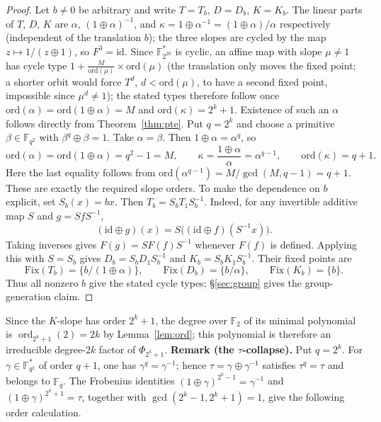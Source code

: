 \documentclass[11pt]{article}
\begin{document}
\begin{proof}
Let $b\ne0$ be arbitrary and write $T=T_b$, $D=D_b$, $K=K_b$.
The linear parts of $T$, $D$, $K$ are
$\alpha$, $(1\oplus\alpha)^{-1}$, and
$\kappa=1\oplus\alpha^{-1}=(1\oplus\alpha)/\alpha$
respectively (independent of the translation $b$); the three slopes are cycled by
the map $z\mapsto 1/(z\oplus1)$, so $F^3=\mathrm{id}$. Since
$\mathbb{F}_{2^{2k}}^*$ is cyclic, an affine map with slope $\mu\ne1$ has cycle type
$1+\frac{M}{\mathrm{ord}(\mu)}\times\mathrm{ord}(\mu)$ (the translation only moves the
fixed point; a shorter orbit would force $T^d$, $d<\mathrm{ord}(\mu)$, to have a second
fixed point, impossible since $\mu^d\ne1$); the stated types therefore follow once
$\mathrm{ord}(\alpha)=\mathrm{ord}(1\oplus\alpha)=M$ and
$\mathrm{ord}(\kappa)=2^k+1$. Existence of such an $\alpha$ follows directly from Theorem~\ref{thm:pte}.
Put $q=2^k$ and choose a primitive $\beta\in\mathbb F_{q^2}$ with
$\beta^q\oplus\beta=1$. Take $\alpha=\beta$. Then $1\oplus\alpha=\alpha^q$,
so
\[
\mathrm{ord}(\alpha)=\mathrm{ord}(1\oplus\alpha)=q^2-1=M,
\qquad
\kappa=\frac{1\oplus\alpha}{\alpha}=\alpha^{q-1},
\qquad \mathrm{ord}(\kappa)=q+1.
\]
Here the last equality follows from
$\mathrm{ord}(\alpha^{q-1})=M/\gcd(M,q-1)=q+1$.
These are exactly the required slope orders. To make the dependence on $b$
explicit, set $S_b(x)=bx$. Then $T_b=S_bT_1S_b^{-1}$.
Indeed, for any invertible additive map $S$ and $g=SfS^{-1}$,
\[
(\mathrm{id}\oplus g)(x)=S\bigl((\mathrm{id}\oplus f)(S^{-1}x)\bigr).
\]
Taking inverses gives $F(g)=SF(f)S^{-1}$ whenever $F(f)$ is defined.
Applying this with $S=S_b$ gives $D_b=S_bD_1S_b^{-1}$ and
$K_b=S_bK_1S_b^{-1}$. Their fixed points are
\[
\mathrm{Fix}(T_b)=\{b/(1\oplus\alpha)\},\qquad
\mathrm{Fix}(D_b)=\{b/\alpha\},\qquad
\mathrm{Fix}(K_b)=\{b\}.
\]
Thus all nonzero $b$ give the stated cycle types; \S\ref{sec:group} gives
the group-generation claim.
\end{proof}
Since the $K$-slope has order $2^k+1$, the degree over $\mathbb{F}_2$ of its
minimal polynomial is $\operatorname{ord}_{2^k+1}(2)=2k$ by
Lemma~\ref{lem:ord}; this polynomial is therefore an irreducible degree-$2k$
factor of $\Phi_{2^k+1}$.
\textbf{Remark (the $\tau$-collapse).}
Put $q=2^k$. For $\gamma\in\mathbb F_{q^2}^*$ of order $q+1$,
one has $\gamma^q=\gamma^{-1}$; hence
$\tau=\gamma\oplus\gamma^{-1}$ satisfies $\tau^q=\tau$ and belongs to
$\mathbb F_q$. The Frobenius identities
$(1\oplus\gamma)^{2^k-1}=\gamma^{-1}$ and $(1\oplus\gamma)^{2^k+1}=\tau$,
together with $\gcd(2^k-1,2^k+1)=1$, give the following order calculation.
\end{document}
